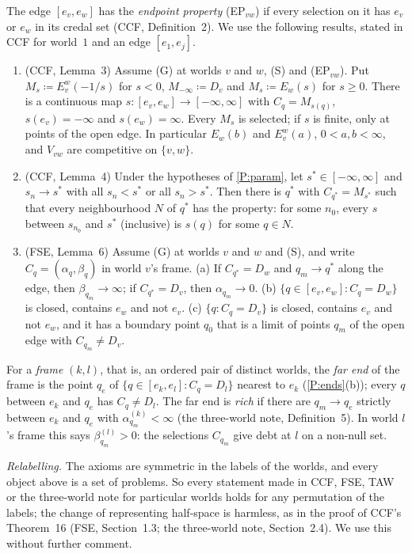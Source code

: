 \documentclass[11pt]{article}
\theoremstyle{definition}\newtheorem{definition}[theorem]{Definition}
\theoremstyle{remark}\newtheorem{remark}[theorem]{Remark}
\begin{document}
The edge $[e_v,e_w]$ has the \emph{endpoint property} (EP$_{vw}$) if every
selection on it has $e_v$ or $e_w$ in its credal set (CCF,
Definition~2). We use the following results, stated in CCF for world~$1$
and an edge $[e_1,e_j]$.
\begin{enumerate}[label=(P\arabic*),leftmargin=*,itemsep=2pt]
\item\label{P:param} (CCF, Lemma~3) Assume (G) at worlds $v$ and $w$, (S)
and (EP$_{vw}$). Put $M_s\coloneqq E^w_v(-1/s)$ for $s<0$,
$M_{-\infty}\coloneqq D_v$ and $M_s\coloneqq E_w(s)$ for $s\ge0$. There is a
continuous map $s\colon[e_v,e_w]\to[-\infty,\infty]$ with $C_q=M_{s(q)}$,
$s(e_v)=-\infty$ and $s(e_w)=\infty$. Every $M_s$ is selected; if $s$ is
finite, only at points of the open edge. In particular $E_w(b)$ and
$E^w_v(a)$, $0<a,b<\infty$, and $V_{vw}$ are competitive on $\{v,w\}$.
\item\label{P:approach} (CCF, Lemma~4) Under the hypotheses of
\ref{P:param}, let $s^*\in[-\infty,\infty]$ and $s_n\to s^*$ with all
$s_n<s^*$ or all $s_n>s^*$. Then there is $q^*$ with $C_{q^*}=M_{s^*}$ such
that every neighbourhood $N$ of $q^*$ has the property: for some $n_0$,
every $s$ between $s_{n_0}$ and $s^*$ (inclusive) is $s(q)$ for some $q\in
N$.
\item\label{P:ends} (FSE, Lemma~6) Assume (G) at worlds $v$ and $w$ and
(S), and write $C_q=(\alpha_q,\beta_q)$ in world $v$'s frame. (a) If
$C_{q^*}=D_w$ and $q_m\to q^*$ along the edge, then $\beta_{q_m}\to\infty$;
if $C_{q^*}=D_v$, then $\alpha_{q_m}\to0$. (b) $\{q\in[e_v,e_w]:C_q=D_w\}$
is closed, contains $e_w$ and not $e_v$. (c) $\{q:C_q=D_v\}$ is closed,
contains $e_v$ and not $e_w$, and it has a boundary point $q_0$ that is a
limit of points $q_m$ of the open edge with $C_{q_m}\ne D_v$.
\end{enumerate}
For a \emph{frame} $(k,l)$, that is, an ordered pair of distinct worlds,
the \emph{far end} of the frame is the point $q_e$ of
$\{q\in[e_k,e_l]:C_q=D_l\}$ nearest to $e_k$ (\ref{P:ends}(b)); every $q$
between $e_k$ and $q_e$ has $C_q\ne D_l$. The far end is \emph{rich} if
there are $q_m\to q_e$ strictly between $e_k$ and $q_e$ with
$\alpha^{(k)}_{q_m}<\infty$ (the three-world note, Definition~5). In world
$l$'s frame this says $\beta^{(l)}_{q_m}>0$: the selections $C_{q_m}$ give
debt at $l$ on a non-null set.

\emph{Relabelling.} The axioms are symmetric in the labels of the worlds,
and every object above is a set of problems. So every statement made in
CCF, FSE, TAW or the three-world note for particular worlds holds for any
permutation of the labels; the change of representing half-space is
harmless, as in the proof of CCF's Theorem~16 (FSE, Section~1.3; the
three-world note, Section~2.4). We use this without further comment.
\end{document}
